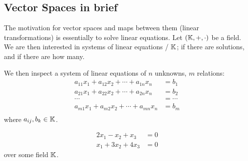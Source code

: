 \subsection{Vector Spaces in brief}
\begin{intuition}
    The motivation for vector spaces and maps between them (linear transformations) is essentially to solve linear equations. Let \((\mathbb{K}, +, \cdot)\) be a field. We are then interested in systems of linear equations / \(\mathbb{K}\); if there are solutions, and if there are how many.
\end{intuition}
We then inspect a system of linear equations of \(n\) unknowns, \(m\) relations:
\begin{align*}
    a_{11}x_1 + a_{12}x_2 + \cdots + a_{1n}x_n & = b_1    \\
    a_{21}x_1 + a_{22}x_2 + \cdots + a_{2n}x_n & = b_2    \\
    \cdots                                     & = \cdots \\
    a_{m1}x_1 + a_{m2}x_2 + \cdots + a_{mn}x_n & = b_m    \\
\end{align*}
where \(a_{ij}, b_k \in \mathbb{K}\).
\begin{example}
    \begin{align}
        2x_1 - x_2 + x_3  & = 0 \label{eq:1.1} \\
        x_1 + 3x_2 + 4x_3 & = 0 \label{eq:1.2}
    \end{align}
    over some field \(\mathbb{K}\).
\end{example}
